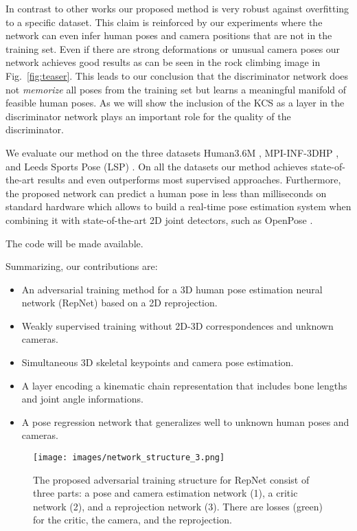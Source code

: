 \documentclass[10pt,twocolumn,letterpaper]{article}
\begin{document}
In contrast to other works our proposed method is very robust against overfitting to a specific dataset.
This claim is reinforced by our experiments where the network can even infer human poses and camera positions that are not in the training set.
Even if there are strong deformations or unusual camera poses our network achieves good results as can be seen in the rock climbing image in Fig.~\ref{fig:teaser}.
This leads to our conclusion that the discriminator network does not \textit{memorize} all poses from the training set but learns a meaningful manifold of feasible human poses.
As we will show the inclusion of the KCS as a layer in the discriminator network plays an important role for the quality of the discriminator.

We evaluate our method on the three datasets Human3.6M \cite{h36m_pami}, MPI-INF-3DHP \cite{mpii3dhp2017}, and Leeds Sports Pose (LSP) \cite{LeadsSports2010}. 
On all the datasets our method achieves state-of-the-art results and even outperforms most supervised approaches.
Furthermore, the proposed network can predict a human pose in less than  milliseconds on standard hardware which allows to build a real-time pose estimation system when combining it with state-of-the-art 2D joint detectors, such as OpenPose \cite{cao2017realtime}.

The code will be made available.

Summarizing, our contributions are:

\begin{itemize}
	\item An adversarial training method for a 3D human pose estimation neural network (RepNet) based on a 2D reprojection.
	\item Weakly supervised training without 2D-3D correspondences and unknown cameras.
	\item Simultaneous 3D skeletal keypoints and camera pose estimation.
	\item A layer encoding a kinematic chain representation that includes bone lengths and joint angle informations.
	\item A pose regression network that generalizes well to unknown human poses and cameras.
\end{itemize}

\begin{figure*}[ht]
	\centering
	\texttt{[image: images/network\_structure\_3.png]}
	\caption{The proposed adversarial training structure for RepNet consist of three parts: a pose and camera estimation network (1), a critic network (2), and a reprojection network (3). There are losses (green) for the critic, the camera, and the reprojection.}
	\label{fig:network}
\end{figure*}
\end{document}
